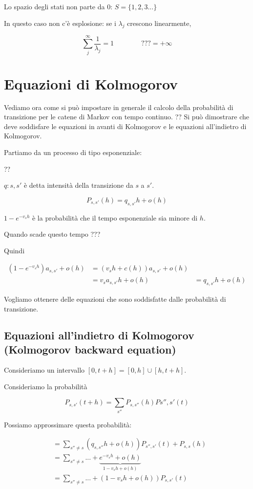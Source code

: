 \documentclass[a4paper,12pt]{book}
\begin{document}
Lo spazio degli stati non parte da 0: $ S = \{1,2,3...\} $

In questo caso non c'è esplosione: se i $\lambda_j$ crescono linearmente,

$$ \sum_j^{\infty} \frac{1}{\lambda_j} = 1 \qquad \qquad ??? = +\infty$$ %

\section{Equazioni di Kolmogorov}

Vediamo ora come si può impostare in generale il calcolo della probabilità di transizione per le catene di Markov con tempo continuo. ?? %
 Si può dimostrare che deve soddisfare le equazioni in avanti di Kolmogorov e le equazioni all'indietro di Kolmogorov. 

Partiamo da un processo di tipo esponenziale:

?? %

$ q:{s,s'} $ è detta intensità della transizione da $ s $ a $ s' $.

$$ P_{s,s'}(h) = q_{s,s'}h + o(h) $$

$ 1 - e^{-v_s h} $ è la probabilità che il tempo esponenziale sia minore di $ h $. 

Quando scade questo tempo ??? %

Quindi 

\begin{align*}
	(1 - e^{-v_s h})a_{s,s'} + o(h) & = (v_s h + c(h)) a_{s,s'} + o(h) \\ %
	& = v_s a_{s,s'} h + o(h) & = q_{s,s'} h + o(h)
\end{align*}

Vogliamo ottenere delle equazioni che sono soddisfatte dalle probabilità di transizione.

\subsection{Equazioni all'indietro di Kolmogorov (Kolmogorov backward equation)}

Consideriamo un intervallo $ [0, t+h] = [0, h] \cup [h, t+h] $. %

Consideriamo la probabilità

$$ P_{s,s'} (t+h) = \sum_{s''} P_{s,s''}(h)P{s'', s'}(t) $$

Possiamo approssimare questa probabilità:

\begin{align*}
	& = \sum_{s'' \ne s} (q_{s,s''}h + o(h))P_{s'',s'}(t) + P_{s,s}(h) \\
	& = \sum_{s'' \ne s} ... + \underbrace{e^{-v_s h} + o(h)}_{1 - v_s h + o(h)}\\ %
	& = \sum_{s'' \ne s} ... + (1 - v_s h + o(h))P_{s,s'}(t) %
\end{align*}
\end{document}
